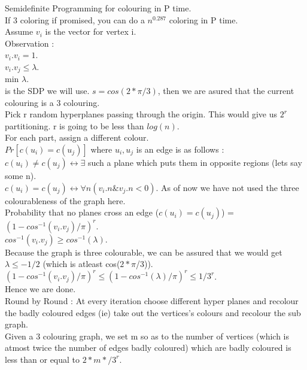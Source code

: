 \documentclass[solution,addpoints,12pt]{exam}
\begin{document}
Semidefinite Programming for colouring in P time.\\
If 3 coloring if promised, you can do a $n^{0.287}$ coloring in P time.\\
Assume $v_i$ is the vector for vertex i.\\
Observation :\\
$v_i.v_i = 1$.\\
$v_i.v_j \le \lambda$.\\
min $\lambda$.\\
is the SDP we will use. $s = cos(2*\pi/3)$, then we are asured that
the current colouring is a 3 colouring.\\
Pick r random hyperplanes passing through the origin. This
would give us $2^r$ partitioning. r is going to be less than $log(n)$.\\
For each part, assign a different colour.\\
$Pr[c(u_i) = c(u_j)]$ where $u_i, u_j$ is an edge is as follows :\\
$c(u_i) \ne c(u_j) \leftrightarrow \exists$ such a plane which
puts them in opposite regions (lets say some n).\\
$c(u_i) = c(u_j) \leftrightarrow \forall n (v_i.n \& v_j.n < 0)$.
As of now we have not used the three colourableness of the
graph here.\\
Probability that no planes cross an edge ($c(u_i) = c(u_j)$) =
$(1 - {cos}^{-1}(v_i.v_j)/\pi)^r$.\\
${cos}^{-1}(v_i.v_j) \ge {cos}^{-1}(\lambda)$.\\
Because the graph is three colourable, we can be assured that we would
get $\lambda \le -1/2$ (which is atleast cos($2*\pi$/3)).\\
$(1 - {cos}^{-1}(v_i.v_j)/\pi)^r \le (1 - {cos}^{-1}(\lambda)/\pi)^r \le 1/3^r$.\\
Hence we are done.\\

Round by Round : At every iteration choose different hyper planes
and recolour the badly coloured edges (ie) take
out the vertices's colours and recolour the
sub graph.\\
Given a 3 colouring graph, we set m so as to the number
of vertices (which is atmost twice the number of edges badly coloured)
which are badly coloured is less than or equal to $2*m*/3^r$.
\end{document}

